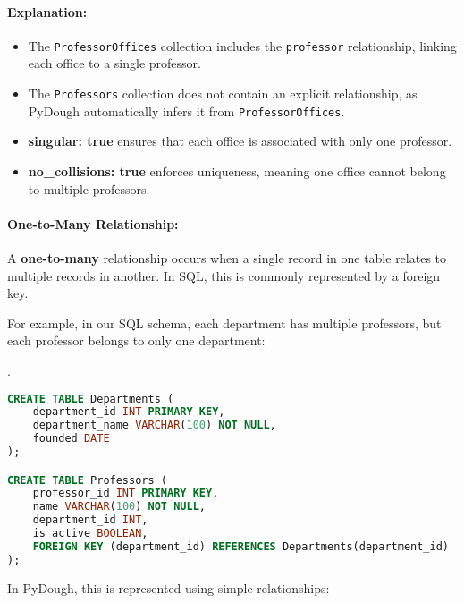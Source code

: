 \documentclass{article}
\begin{document}
\paragraph{Explanation:}
\begin{itemize}
    \item The \texttt{ProfessorOffices} collection includes the \texttt{professor} relationship, linking each office to a single professor.
    \item The \texttt{Professors} collection does not contain an explicit relationship, as PyDough automatically infers it from \texttt{ProfessorOffices}.
    \item \textbf{singular: true} ensures that each office is associated with only one professor.
    \item \textbf{no\_collisions: true} enforces uniqueness, meaning one office cannot belong to multiple professors.
\end{itemize}


\paragraph{One-to-Many Relationship:}

A \textbf{one-to-many} relationship occurs when a single record in one table relates to multiple records in another. In SQL, this is commonly represented by a foreign key.

For example, in our SQL schema, each department has multiple professors, but each professor belongs to only one department:

.

\begin{lstlisting}[language=SQL]
CREATE TABLE Departments (
    department_id INT PRIMARY KEY,
    department_name VARCHAR(100) NOT NULL,
    founded DATE
);

CREATE TABLE Professors (
    professor_id INT PRIMARY KEY,
    name VARCHAR(100) NOT NULL,
    department_id INT,
    is_active BOOLEAN,
    FOREIGN KEY (department_id) REFERENCES Departments(department_id)
);

\end{lstlisting}

In PyDough, this is represented using simple relationships:
\end{document}

